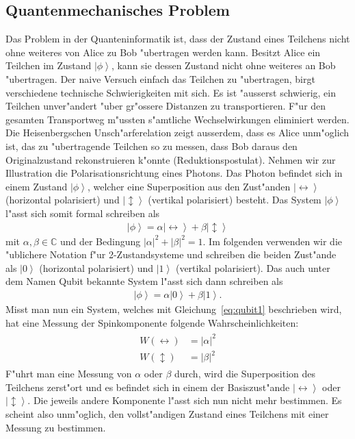 \begin{refsection}
\subsection{Quantenmechanisches Problem}
Das Problem in der Quanteninformatik ist, dass der Zustand eines Teilchens nicht ohne weiteres von Alice zu Bob "ubertragen werden kann. Besitzt Alice ein Teilchen im Zustand $\left|\phi\right\rangle$, kann sie dessen Zustand nicht ohne weiteres an Bob "ubertragen. Der naive Versuch einfach das Teilchen zu "ubertragen, birgt verschiedene technische Schwierigkeiten mit sich. Es ist "ausserst schwierig, ein Teilchen unver"andert "uber gr"ossere Distanzen zu transportieren. F"ur den gesamten Transportweg m"ussten s"amtliche Wechselwirkungen eliminiert werden. 
\\
Die Heisenbergschen Unsch"arferelation zeigt ausserdem, dass es Alice unm"oglich ist, das zu "ubertragende Teilchen so zu messen, dass Bob daraus den Originalzustand rekonstruieren k"onnte (Reduktionspostulat). Nehmen wir zur Illustration die Polarisationsrichtung eines Photons. Das Photon befindet sich in einem Zustand $\left|\phi\right\rangle$, welcher eine Superposition aus den Zust"anden $\left|\leftrightarrow\right\rangle$ (horizontal polarisiert) und $\left|\updownarrow\right\rangle$ (vertikal polarisiert) besteht. Das System $\left|\phi\right\rangle$ l"asst sich somit formal schreiben als
\begin{align}\label{eq:qubit1}
\left|\phi\right\rangle = \alpha\left|\leftrightarrow\right\rangle + \beta\left|\updownarrow\right\rangle 
\end{align}
mit $\alpha, \beta \in \mathbb{C}$ und der Bedingung $\left|\alpha\right|^{2} + \left|\beta\right|^{2} = 1$. Im folgenden verwenden wir die "ublichere Notation f"ur 2-Zustandsysteme und schreiben die beiden Zust"ande als $\left| 0 \right\rangle$ (horizontal polarisiert) und $\left| 1 \right\rangle$ (vertikal polarisiert). Das auch unter dem Namen Qubit bekannte System l"asst sich dann schreiben als 
\begin{align}\label{eq:qubit2}
\left|\phi\right\rangle = \alpha\left|0\right\rangle + \beta\left|1\right\rangle.
\end{align}
Misst man nun ein System, welches mit Gleichung~\ref{eq:qubit1} beschrieben wird, hat eine Messung der Spinkomponente folgende Wahrscheinlichkeiten:
\begin{align}
	\begin{split}
		W\left(\leftrightarrow\right) & =\left|\alpha\right|^2  \\
	    W\left(\updownarrow\right) & =\left|\beta\right|^2
	\end{split}
\end{align}
F"uhrt man eine Messung von $\alpha$ oder $\beta$ durch, wird die Superposition des Teilchens zerst"ort und es befindet sich in einem der Basiszust"ande $\left|\leftrightarrow\right\rangle$ oder $\left|\updownarrow\right\rangle$. Die jeweils andere Komponente l"asst sich nun nicht mehr bestimmen. Es scheint also unm"oglich, den vollst"andigen Zustand eines Teilchens mit einer Messung zu bestimmen.

\end{refsection}
